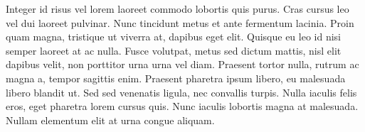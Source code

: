 Integer id risus vel lorem laoreet commodo lobortis quis purus. Cras cursus leo vel dui laoreet pulvinar. Nunc tincidunt metus et ante fermentum lacinia. Proin quam magna, tristique ut viverra at, dapibus eget elit. Quisque eu leo id nisi semper laoreet at ac nulla. Fusce volutpat, metus sed dictum mattis, nisl elit dapibus velit, non porttitor urna urna vel diam. Praesent tortor nulla, rutrum ac magna a, tempor sagittis enim. Praesent pharetra ipsum libero, eu malesuada libero blandit ut. Sed sed venenatis ligula, nec convallis turpis. Nulla iaculis felis eros, eget pharetra lorem cursus quis. Nunc iaculis lobortis magna at malesuada. Nullam elementum elit at urna congue aliquam.